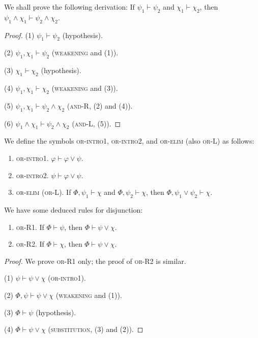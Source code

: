 \begin{example}
    We shall prove the following derivation: If $\psi_1\vdash\psi_2$ and $\chi_1\vdash\chi_2$, then $\psi_1\wedge\chi_1\vdash\psi_2\wedge\chi_2$.
\end{example}

\begin{proof}
    (1) $\psi_1\vdash\psi_2$ (hypothesis). 
    
    (2) $\psi_1,\chi_1\vdash\psi_2$ (\textsc{weakening} and (1)). 
    
    (3) $\chi_1\vdash\chi_2$ (hypothesis). 
    
    (4) $\psi_1,\chi_1\vdash\chi_2$ (\textsc{weakening} and (3)). 
    
    (5) $\psi_1,\chi_1\vdash\psi_2\wedge\chi_2$ (\textsc{and-R}, (2) and (4)). 
    
    (6) $\psi_1\wedge\chi_1\vdash\psi_2\wedge\chi_2$ (\textsc{and-L}, (5)).
\end{proof}

\begin{definition}
    We define the symbols \textsc{or-intro1}, \textsc{or-intro2}, and \textsc{or-elim} (also \textsc{or-L}) as follows: 
    \begin{enumerate}[itemindent=0ex, itemsep=0pt, label=\upshape{(\alph*)}]
        \item \textsc{or-intro1}. $\varphi\vdash\varphi\vee\psi$.
        \item \textsc{or-intro2}. $\psi\vdash\varphi\vee\psi$.
        \item \textsc{or-elim} (\textsc{or-L}). If $\Phi,\psi_1\vdash\chi$ and $\Phi,\psi_2\vdash\chi$, then $\Phi,\psi_1\vee\psi_2\vdash\chi$.
    \end{enumerate}
\end{definition}

\begin{example}
    We have some deduced rules for disjunction:
    \begin{enumerate}[itemindent=0ex, itemsep=0pt, label=\upshape{(\alph*)}]
        \item \textsc{or-R1}. If $\Phi\vdash\psi$, then $\Phi\vdash\psi\vee\chi$.
        \item \textsc{or-R2}. If $\Phi\vdash\chi$, then $\Phi\vdash\psi\vee\chi$.
    \end{enumerate}
\end{example}

\begin{proof}
    We prove \textsc{or-R1} only; the proof of \textsc{or-R2} is similar. 

    (1) $\psi\vdash\psi\vee\chi$ (\textsc{or-intro1}). 
    
    (2) $\Phi,\psi\vdash\psi\vee\chi$ (\textsc{weakening} and (1)). 
    
    (3) $\Phi\vdash\psi$ (hypothesis). 
    
    (4) $\Phi\vdash\psi\vee\chi$ (\textsc{substitution}, (3) and (2)).
\end{proof}

